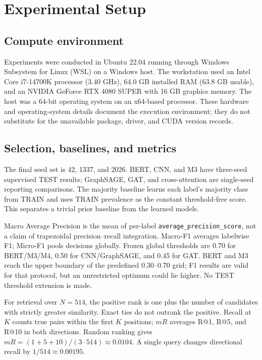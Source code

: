 \documentclass[conference]{IEEEtran}
\begin{document}
\section{Experimental Setup}\label{sec:setup}
\subsection{Compute environment}
Experiments were conducted in Ubuntu 22.04 running through Windows Subsystem for Linux (WSL) on a Windows host. The workstation used an Intel Core i7-14700K processor (3.40 GHz), 64.0 GB installed RAM (63.8 GB usable), and an NVIDIA GeForce RTX 4080 SUPER with 16 GB graphics memory. The host was a 64-bit operating system on an x64-based processor. These hardware and operating-system details document the execution environment; they do not substitute for the unavailable package, driver, and CUDA version records.

\subsection{Selection, baselines, and metrics}
The final seed set is 42, 1337, and 2026. BERT, CNN, and M3 have three-seed supervised TEST results; GraphSAGE, GAT, and cross-attention are single-seed reporting comparisons. The majority baseline learns each label's majority class from TRAIN and uses TRAIN prevalence as the constant threshold-free score. This separates a trivial prior baseline from the learned models.

Macro Average Precision is the mean of per-label \texttt{average\_precision\_score}, not a claim of trapezoidal precision--recall integration. Macro-F1 averages labelwise F1; Micro-F1 pools decisions globally. Frozen global thresholds are 0.70 for BERT/M3/M4, 0.50 for CNN/GraphSAGE, and 0.45 for GAT. BERT and M3 reach the upper boundary of the predefined 0.30--0.70 grid; F1 results are valid for that protocol, but an unrestricted optimum could lie higher. No TEST threshold extension is made.

For retrieval over $N=514$, the positive rank is one plus the number of candidates with strictly greater similarity. Exact ties do not outrank the positive. Recall at $K$ counts true pairs within the first $K$ positions; $mR$ averages R@1, R@5, and R@10 in both directions. Random ranking gives $mR=(1+5+10)/(3\cdot514)\approx0.0104$. A single query changes directional recall by $1/514\approx0.00195$.
\end{document}
